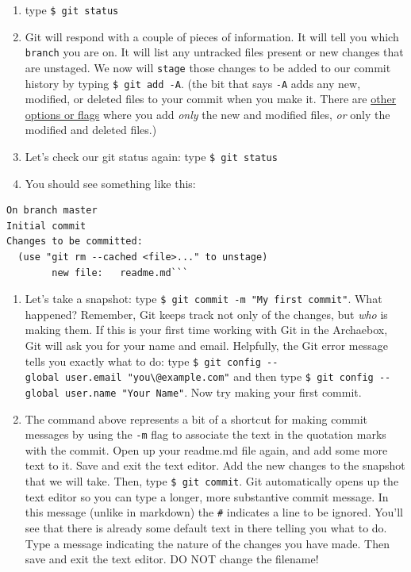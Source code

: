 \documentclass[english,]{book}
\providecommand{\tightlist}{%
  \setlength{\itemsep}{0pt}\setlength{\parskip}{0pt}}
\begin{document}
\begin{enumerate}
\def\labelenumi{\alph{enumi}.}
\tightlist
\item
  type \texttt{\$\ git\ status}
\item
  Git will respond with a couple of pieces of information. It will tell
  you which \texttt{branch} you are on. It will list any untracked files
  present or new changes that are unstaged. We now will \texttt{stage}
  those changes to be added to our commit history by typing
  \texttt{\$\ git\ add\ -A}. (the bit that says \texttt{-A} adds any
  new, modified, or deleted files to your commit when you make it. There
  are
  \href{https://stackoverflow.com/questions/572549/difference-between-git-add-a-and-git-add\#572660}{other
  options or flags} where you add \emph{only} the new and modified
  files, \emph{or} only the modified and deleted files.)
\item
  Let's check our git status again: type \texttt{\$\ git\ status}
\item
  You should see something like this:
\end{enumerate}

\begin{verbatim}
On branch master
Initial commit
Changes to be committed:
  (use "git rm --cached <file>..." to unstage)
        new file:   readme.md```
\end{verbatim}

\begin{enumerate}
\def\labelenumi{\alph{enumi}.}
\setcounter{enumi}{4}
\tightlist
\item
  Let's take a snapshot: type
  \texttt{\$\ git\ commit\ -m\ "My\ first\ commit"}. What happened?
  Remember, Git keeps track not only of the changes, but \emph{who} is
  making them. If this is your first time working with Git in the
  Archaebox, Git will ask you for your name and email. Helpfully, the
  Git error message tells you exactly what to do: type
  \texttt{\$\ git\ config\ -\/-global\ user.email\ "you\textbackslash{}@example.com"}
  and then type
  \texttt{\$\ git\ config\ -\/-global\ user.name\ "Your\ Name"}. Now try
  making your first commit.
\item
  The command above represents a bit of a shortcut for making commit
  messages by using the \texttt{-m} flag to associate the text in the
  quotation marks with the commit. Open up your readme.md file again,
  and add some more text to it. Save and exit the text editor. Add the
  new changes to the snapshot that we will take. Then, type
  \texttt{\$\ git\ commit}. Git automatically opens up the text editor
  so you can type a longer, more substantive commit message. In this
  message (unlike in markdown) the \texttt{\#} indicates a line to be
  ignored. You'll see that there is already some default text in there
  telling you what to do. Type a message indicating the nature of the
  changes you have made. Then save and exit the text editor. DO NOT
  change the filename!
\end{enumerate}
\end{document}
